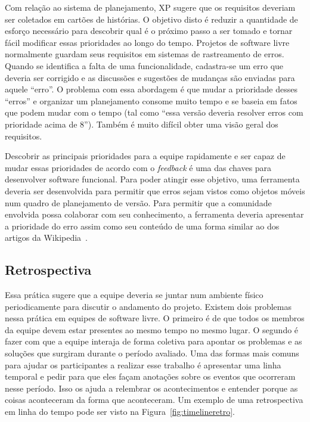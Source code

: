 
Com relação ao sistema de planejamento, XP sugere que os requisitos
deveriam ser coletados em cartões de histórias. O objetivo disto é
reduzir a quantidade de esforço necessário para descobrir qual é o
próximo passo a ser tomado e tornar fácil modificar essas prioridades
ao longo do tempo. Projetos de software livre normalmente guardam seus
requisitos em sistemas de rastreamento de erros. Quando se identifica
a falta de uma funcionalidade, cadastra-se um erro que deveria ser
corrigido e as discussões e sugestões de mudanças são enviadas para
aquele ``erro''. O problema com essa abordagem é que mudar a
prioridade desses ``erros'' e organizar um planejamento consome muito
tempo e se baseia em fatos que podem mudar com o tempo (tal como
``essa versão deveria resolver erros com prioridade acima de
8''). Também é muito difícil obter uma visão geral dos requisitos.

Descobrir as principais prioridades para a equipe rapidamente e ser
capaz de mudar essas prioridades de acordo com o \emph{feedback} é uma
das chaves para desenvolver software funcional. Para poder atingir
esse objetivo, uma ferramenta deveria ser desenvolvida para permitir
que erros sejam vistos como objetos móveis num quadro de planejamento
de versão. Para permitir que a comunidade envolvida possa colaborar
com seu conhecimento, a ferramenta deveria apresentar a prioridade do
erro assim como seu conteúdo de uma forma similar ao dos artigos da
Wikipedia~\cite{Surowiecki2004,Tapscott2006,Benkler2006}.

\subsection{Retrospectiva}
\label{subsec:retrospect}

Essa prática sugere que a equipe deveria se juntar num ambiente físico
periodicamente para discutir o andamento do projeto. Existem dois
problemas nessa prática em equipes de software livre. O primeiro é de
que todos os membros da equipe devem estar presentes ao mesmo tempo no
mesmo lugar. O segundo é fazer com que a equipe interaja de forma
coletiva para apontar os problemas e as soluções que surgiram durante
o período avaliado. Uma das formas mais comuns para ajudar os
participantes a realizar esse trabalho é apresentar uma linha temporal
e pedir para que eles façam anotações sobre os eventos que ocorreram
nesse período. Isso os ajuda a relembrar os acontecimentos e entender
porque as coisas aconteceram da forma que aconteceram. Um exemplo de
uma retrospectiva em linha do tempo pode ser visto na
Figura~\ref{fig:timelineretro}.

